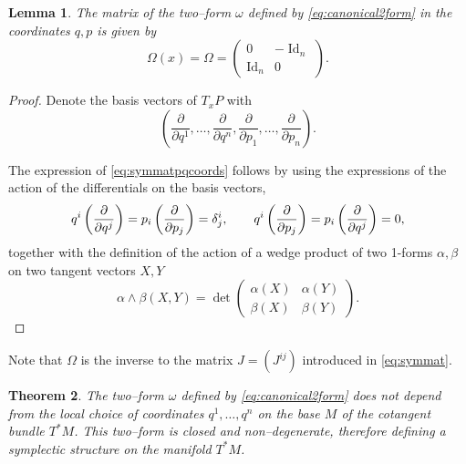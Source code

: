 \documentclass[english,fontsize=11pt,paper=a5,oneside]{scrbook}
\let\d\relax
\newcommand{\d}{\mathrm{d}}
\DeclareMathOperator{\Id}{Id}
\newtheorem{theorem}{Theorem}[chapter]
\newtheorem{lemma}[theorem]{Lemma}
\theoremstyle{definition}
\begin{document}
\begin{lemma}
  The matrix of the two--form $\omega$ defined by \eqref{eq:canonical2form} in the coordinates $q,p$ is given by
  \begin{equation}\label{eq:symmatpqcoords}
    \Omega(x) = \Omega = \begin{pmatrix}
      0     & -\Id_n \\
      \Id_n & 0
    \end{pmatrix}.
  \end{equation}
\end{lemma}
\begin{proof}
  Denote the basis vectors of $T_x P$ with
  \begin{equation}
    \left(
    \frac{\partial}{\partial q^1}, \ldots, \frac{\partial}{\partial q^n},
    \frac{\partial}{\partial p_1}, \ldots, \frac{\partial}{\partial p_n}
    \right).
  \end{equation}

  The expression of \eqref{eq:symmatpqcoords} follows by using the expressions of the action of the differentials on the basis vectors,
  \begin{equation}
    \d q^i\left(\frac{\partial}{\partial q^j}\right) = \d p_i\left(\frac{\partial}{\partial p_j}\right) =\delta^i_j, \qquad
    \d q^i\left(\frac{\partial}{\partial p_j}\right) =
    \d p_i\left(\frac{\partial}{\partial q^j}\right) = 0,
  \end{equation}
  together with the definition of the action of a wedge product of two 1-forms $\alpha, \beta$ on two tangent vectors $X, Y$
  \begin{equation}
    \alpha \wedge \beta (X, Y) = \det\begin{pmatrix}
      \alpha(X) & \alpha(Y) \\
      \beta(X)  & \beta(Y)
    \end{pmatrix}.
  \end{equation}
\end{proof}

Note that $\Omega$ is the inverse to the matrix $J = (J^{ij})$ introduced in \eqref{eq:symmat}.

\begin{theorem}\label{thm:propc2f}
  The two--form $\omega$ defined by \eqref{eq:canonical2form} does not depend from the local choice of coordinates $q^1, \ldots, q^n$ on the base $M$ of the cotangent bundle $T^* M$. This two--form is closed and non--degenerate, therefore defining a symplectic structure on the manifold $T^*M$.
\end{theorem}
\end{document}
